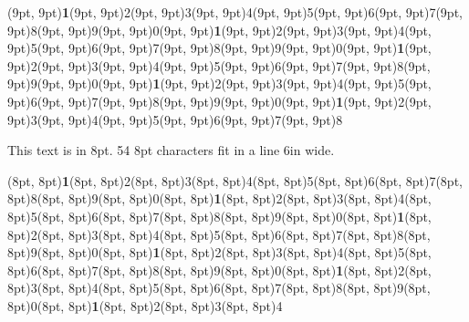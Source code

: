 \documentclass[10,a4paper]{article}
\newcommand{\highlight}[1]{{\color{red}\textbf{1}}}
\begin{document}
{\begin{minipage}{6in}
\framebox(9pt, 9pt){\highlight{1}}\framebox(9pt,
9pt){2}\framebox(9pt, 9pt){3}\framebox(9pt,
9pt){4}\framebox(9pt, 9pt){5}\framebox(9pt,
9pt){6}\framebox(9pt, 9pt){7}\framebox(9pt,
9pt){8}\framebox(9pt, 9pt){9}\noindent\framebox(9pt, 9pt){0}\framebox(9pt, 9pt){\highlight{1}}\framebox(9pt,
9pt){2}\framebox(9pt, 9pt){3}\framebox(9pt,
9pt){4}\framebox(9pt, 9pt){5}\framebox(9pt,
9pt){6}\framebox(9pt, 9pt){7}\framebox(9pt,
9pt){8}\framebox(9pt, 9pt){9}\noindent\framebox(9pt, 9pt){0}\framebox(9pt, 9pt){\highlight{1}}\framebox(9pt,
9pt){2}\framebox(9pt, 9pt){3}\framebox(9pt,
9pt){4}\framebox(9pt, 9pt){5}\framebox(9pt,
9pt){6}\framebox(9pt, 9pt){7}\framebox(9pt,
9pt){8}\framebox(9pt, 9pt){9}\noindent\framebox(9pt, 9pt){0}\framebox(9pt, 9pt){\highlight{1}}\framebox(9pt,
9pt){2}\framebox(9pt, 9pt){3}\framebox(9pt,
9pt){4}\framebox(9pt, 9pt){5}\framebox(9pt,
9pt){6}\framebox(9pt, 9pt){7}\framebox(9pt,
9pt){8}\framebox(9pt, 9pt){9}\framebox(9pt, 9pt){0}\framebox(9pt, 9pt){\highlight{1}}\framebox(9pt,
9pt){2}\framebox(9pt, 9pt){3}\framebox(9pt,
9pt){4}\framebox(9pt, 9pt){5}\framebox(9pt,
9pt){6}\framebox(9pt, 9pt){7}\framebox(9pt,
9pt){8}

\vspace{0.7\baselineskip}

This text is in 8pt. 54 8pt characters fit in a line 6in wide.

\vspace{0.7\baselineskip}

\fontsize{8}{8}\selectfont

\framebox(8pt, 8pt){\highlight{1}}\framebox(8pt,
8pt){2}\framebox(8pt, 8pt){3}\framebox(8pt,
8pt){4}\framebox(8pt, 8pt){5}\framebox(8pt,
8pt){6}\framebox(8pt, 8pt){7}\framebox(8pt,
8pt){8}\framebox(8pt, 8pt){9}\noindent\framebox(8pt, 8pt){0}\framebox(8pt, 8pt){\highlight{1}}\framebox(8pt,
8pt){2}\framebox(8pt, 8pt){3}\framebox(8pt,
8pt){4}\framebox(8pt, 8pt){5}\framebox(8pt,
8pt){6}\framebox(8pt, 8pt){7}\framebox(8pt,
8pt){8}\framebox(8pt, 8pt){9}\noindent\framebox(8pt, 8pt){0}\framebox(8pt, 8pt){\highlight{1}}\framebox(8pt,
8pt){2}\framebox(8pt, 8pt){3}\framebox(8pt,
8pt){4}\framebox(8pt, 8pt){5}\framebox(8pt,
8pt){6}\framebox(8pt, 8pt){7}\framebox(8pt,
8pt){8}\framebox(8pt, 8pt){9}\noindent\framebox(8pt, 8pt){0}\framebox(8pt, 8pt){\highlight{1}}\framebox(8pt,
8pt){2}\framebox(8pt, 8pt){3}\framebox(8pt,
8pt){4}\framebox(8pt, 8pt){5}\framebox(8pt,
8pt){6}\framebox(8pt, 8pt){7}\framebox(8pt,
8pt){8}\framebox(8pt, 8pt){9}\framebox(8pt, 8pt){0}\framebox(8pt, 8pt){\highlight{1}}\framebox(8pt,
8pt){2}\framebox(8pt, 8pt){3}\framebox(8pt,
8pt){4}\framebox(8pt, 8pt){5}\framebox(8pt,
8pt){6}\framebox(8pt, 8pt){7}\framebox(8pt,
8pt){8}\framebox(8pt, 8pt){9}\framebox(8pt, 8pt){0}\framebox(8pt, 8pt){\highlight{1}}\framebox(8pt,
8pt){2}\framebox(8pt, 8pt){3}\framebox(8pt,
8pt){4}


\end{minipage}}
\end{document}
